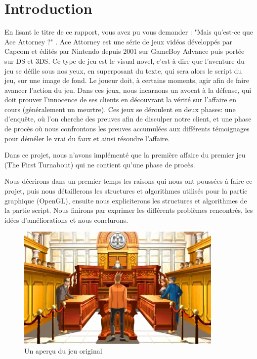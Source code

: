 \section*{Introduction} %
	En lisant le titre de ce rapport, vous avez pu vous demander : "Mais qu'est-ce que Ace Attorney ?" .\newline
	Ace Attorney est une série de jeux vidéos développés par Capcom et édités par Nintendo depuis 2001 sur GameBoy Advance puis portée sur DS et 3DS.\newline
	Ce type de jeu est le visual novel, c'est-à-dire que l'aventure du jeu se défile sous nos yeux, en superposant du texte, qui sera alors le script du jeu, sur une image de fond. Le joueur doit, à certains moments, agir afin de faire avancer l'action du jeu.\newline
	Dans ces jeux, nous incarnons un avocat à la défense, qui doit prouver l'innocence de ses clients en découvrant la vérité sur l'affaire en cours (généralement un meurtre).\newline
	Ces jeux se déroulent en deux phases: une d'enquête, où l'on cherche des preuves afin de disculper notre client, et une phase de procès où nous confrontons les preuves accumulées aux différents témoignages pour déméler le vrai du faux et ainsi résoudre l'affaire.\newline
	
	Dans ce projet, nous n'avons implémenté que la première affaire du premier jeu (The First Turnabout) qui ne contient qu'une phase de procès.\newline
	
	Nous décrirons dans un premier temps les raisons qui nous ont poussées à faire ce projet, puis nous détaillerons les structures et algorithmes utilisés pour la partie graphique (OpenGL), ensuite nous expliciterons les structures et algorithmes de la partie script. Nous finirons par exprimer les différents problèmes rencontrés, les idées d'améliorations et nous conclurons.
	
\begin{figure}[!ht]
	\centering
	\includegraphics [width=10cm]{images/aa_screen_original.jpg}
	\caption{Un aperçu du jeu original}
	\label {screen_game}
\end{figure}